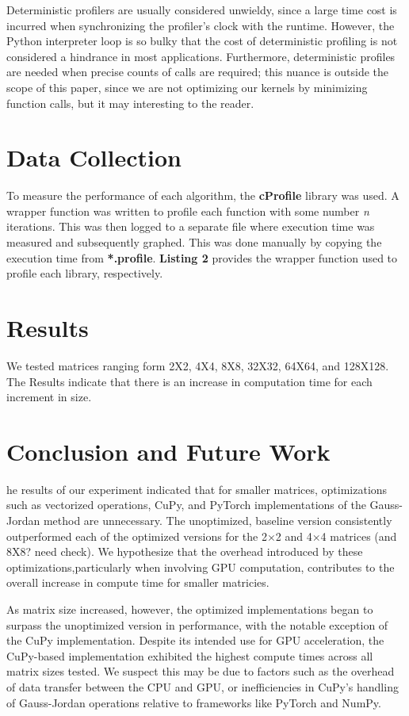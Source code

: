\documentclass[12pt]{article}
\begin{document}
Deterministic profilers are usually considered unwieldy, since a large time cost is incurred when synchronizing the profiler's clock with the runtime. However, the Python interpreter loop is so bulky that the cost of deterministic profiling is not considered a hindrance in most applications. Furthermore, deterministic profiles are needed when precise counts of calls are required; this nuance is outside the scope of this paper, since we are not optimizing our kernels by minimizing function calls, but it may interesting to the reader.

\section{Data Collection}
To measure the performance of each algorithm, the \textbf{cProfile} library was used. A wrapper function was written to profile each function with some number \textit{n} iterations. This was then logged to a separate file where execution time was measured and subsequently graphed. This was done manually by copying the execution time from \textbf{*.profile}. \textbf{Listing 2} provides the wrapper function used to profile each library, respectively.
\hfill\break



\section{Results}
We tested matrices ranging form 2X2, 4X4, 8X8, 32X32, 64X64, and 128X128. The Results indicate that there is an increase in computation time for each increment in size. 

\section{Conclusion and Future Work}
he results of our experiment indicated that for smaller matrices, optimizations such as vectorized operations, CuPy, and PyTorch implementations of the Gauss-Jordan method are unnecessary. The unoptimized, baseline version consistently outperformed each of the optimized versions for the 2×2 and 4×4 matrices (and 8X8? need check). We hypothesize that the overhead introduced by these optimizations,particularly when involving GPU computation, contributes to the overall increase in compute time for smaller matricies.

As matrix size increased, however, the optimized implementations began to surpass the unoptimized version in performance, with the notable exception of the CuPy implementation. Despite its intended use for GPU acceleration, the CuPy-based implementation exhibited the highest compute times across all matrix sizes tested. We suspect this may be due to factors such as the overhead of data transfer between the CPU and GPU, or inefficiencies in CuPy’s handling of Gauss-Jordan operations relative to frameworks like PyTorch and NumPy.  
\end{document}
